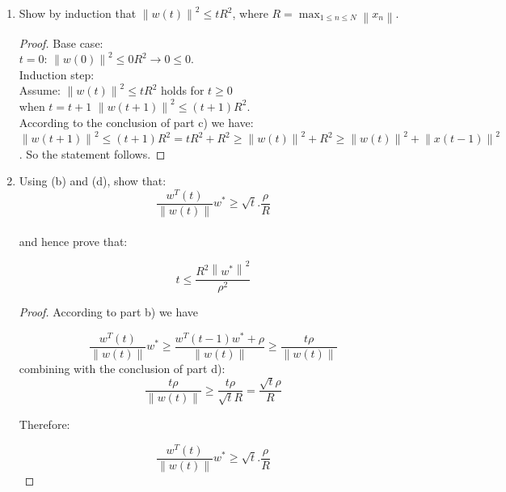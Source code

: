\documentclass[12pt]{article}
\begin{document}
\begin{enumerate}
\begin{enumerate}
\begin{proof}
\begin{itemize}
        Hence: $ 2\left \| w(t - 1) \right \| \left \| x(t - 1) \right \| \cos \theta \geq 0$. \\
        \end{itemize}
      \end{proof}
      \item Show by induction that  $\left \| w(t) \right \|^{2} \leq tR^{2}$, where $R = \max_{1 \leq n \leq N}{\left \| x_{n} \right \|}$.
      \begin{proof}
        Base case: \\$t = 0$:  $\left \| w(0) \right \|^{2} \leq 0R^{2} \rightarrow 0 \leq 0$.\\
        Induction step:\\
        Assume: $\left \| w(t) \right \|^{2} \leq tR^{2}$ holds for $t \geq 0$ \\
        when $t=t+1$  $\left \| w(t + 1) \right \|^{2} \leq (t + 1)R^{2}$. \\
        According to the conclusion of part c) we have:  $\left \| w(t + 1) \right \|^{2} \leq (t + 1)R^{2} = tR^{2} + R^{2} \geq \left \| w(t) \right \|^{2} + R^{2} \geq \left \| w(t) \right \|^{2} + \left \| x(t - 1) \right \|^{2}$.
So the statement follows.
      \end{proof}

      \item Using (b) and (d), show that: \\

    \[ \frac{w^{T}(t)}{\left \| w(t) \right \|}w^{*} \geq \sqrt{t}.\frac{\rho}{R} \] \\

    and hence prove that:

    \[ t \leq \frac{R^{2} \left \| w^{*} \right \|^{2}}{\rho^{2}} \]
    \begin{proof}
      According to part b) we have

    \[ \frac{w^{T}(t)}{\left \| w(t) \right \|}w^{*} \geq \frac{w^{T}(t-1)w^{*}+\rho}{\left \| w(t) \right \|} \geq \frac{t\rho}{\left \| w(t) \right \|} \]
    combining with the conclusion of part d):　
    \[ \frac{t\rho}{\left \| w(t) \right \|} \geq \frac{t\rho}{\sqrt{t}R} =  \frac{\sqrt{t}\rho}{R}\]

    Therefore:

    \[ \frac{w^{T}(t)}{\left \| w(t) \right \|}w^{*} \geq \sqrt{t}.\frac{\rho}{R} \]


\end{proof}
\end{enumerate}
\end{enumerate}
\end{document}
